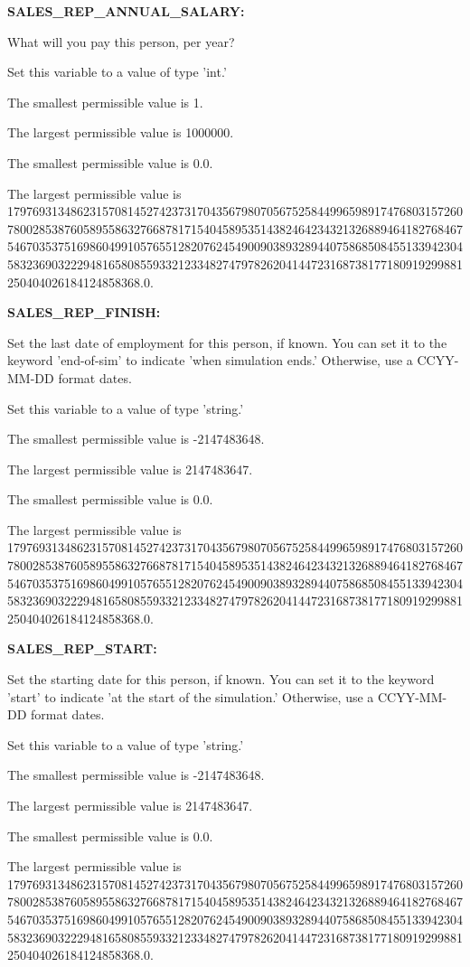 \textbf{SALES\_REP\_ANNUAL\_SALARY:}


What will you pay this person, per year?

Set this variable to a value of type 'int.'

The smallest permissible value is 1.

The largest permissible value is 1000000.

The smallest permissible value is 0.0.

The largest permissible value is 179769313486231570814527423731704356798070567525844996598917476803157260780028538760589558632766878171540458953514382464234321326889464182768467546703537516986049910576551282076245490090389328944075868508455133942304583236903222948165808559332123348274797826204144723168738177180919299881250404026184124858368.0.


\textbf{SALES\_REP\_FINISH:}


Set the last date of employment for this person, if known.  You can set it to the keyword 'end-of-sim' to indicate 'when simulation ends.'  Otherwise, use a CCYY-MM-DD format dates.

Set this variable to a value of type 'string.'

The smallest permissible value is -2147483648.

The largest permissible value is 2147483647.

The smallest permissible value is 0.0.

The largest permissible value is 179769313486231570814527423731704356798070567525844996598917476803157260780028538760589558632766878171540458953514382464234321326889464182768467546703537516986049910576551282076245490090389328944075868508455133942304583236903222948165808559332123348274797826204144723168738177180919299881250404026184124858368.0.


\textbf{SALES\_REP\_START:}


Set the starting date for this person, if known.  You can set it to the keyword 'start' to indicate 'at the start of the simulation.'  Otherwise, use a CCYY-MM-DD format dates.

Set this variable to a value of type 'string.'

The smallest permissible value is -2147483648.

The largest permissible value is 2147483647.

The smallest permissible value is 0.0.

The largest permissible value is 179769313486231570814527423731704356798070567525844996598917476803157260780028538760589558632766878171540458953514382464234321326889464182768467546703537516986049910576551282076245490090389328944075868508455133942304583236903222948165808559332123348274797826204144723168738177180919299881250404026184124858368.0.


